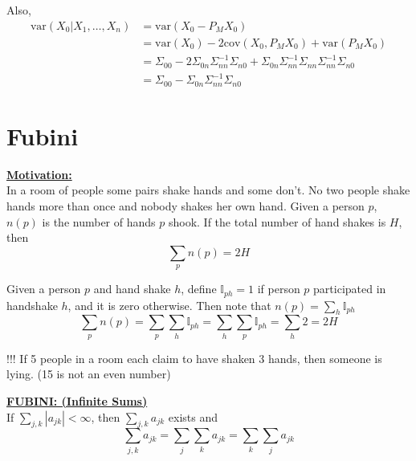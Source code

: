 \documentclass[11pt]{report}
\begin{document}
Also,
\begin{align*}
\text{var}(X_0|X_1,\ldots, X_n)&= \text{var}(X_0- P_MX_0) \\
& = \text{var}(X_0) - 2\text{cov}(X_0, P_MX_0) +  \text{var}(P_MX_0) \\
& = \Sigma_{00} - 2 \Sigma_{0n}\Sigma_{nn}^{-1}\Sigma_{n0} +\Sigma_{0n}\Sigma_{nn}^{-1}\Sigma_{nn}\Sigma_{nn}^{-1}\Sigma_{n0}\\
& = \Sigma_{00} -  \Sigma_{0n}\Sigma_{nn}^{-1}\Sigma_{n0}
\end{align*}

\chapter{Fubini}




\underline{{\bf {Motivation:}}}  \\

In a room of people some pairs shake hands and some don't. No two people shake hands more than once and nobody shakes her own hand. Given a person $p$, $n(p)$ is the number of hands $p$ shook. If the total number of hand shakes is $H$, then
\begin{equation}
\sum_pn(p)=2H \nonumber
\end{equation}

\bigskip

Given a person $p$ and hand shake $h$, define $\mathbb{I}_{ph}=1$ if person $p$ participated in handshake $h$, and it is zero otherwise. Then note that $n(p)=\sum_h\mathbb{I}_{ph}$
\begin{equation}
\sum_pn(p)=\sum_p\sum_h\mathbb{I}_{ph}=\sum_h\sum_p\mathbb{I}_{ph}=\sum_h2=2H \nonumber
\end{equation}

!!! If 5 people in a room each claim to have shaken 3 hands, then someone is lying. (15 is not an even number)

\bigskip

\bigskip

\underline{{\bf {FUBINI: (Infinite Sums)}}}  \\

If $\sum_{j,k}|a_{jk}|<\infty$, then $\sum_{j,k}a_{jk}$ exists and 
\begin{equation}
\sum_{j,k}a_{jk}=\sum_j\sum_ka_{jk}=\sum_k\sum_ja_{jk}\nonumber
\end{equation}
\end{document}
